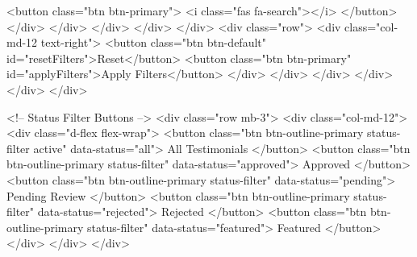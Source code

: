                                                                     <button class="btn btn-primary">
                                                                        <i class="fas fa-search"></i>
                                                                    </button>
                                                                </div>
                                                            </div>
                                                        </div>
                                                    </div>
                                                </div>
                                                <div class="row">
                                                    <div class="col-md-12 text-right">
                                                        <button class="btn btn-default" id="resetFilters">Reset</button>
                                                        <button class="btn btn-primary" id="applyFilters">Apply Filters</button>
                                                    </div>
                                                </div>
                                            </div>
                                        </div>
                                    </div>
                                </div>

                                <!-- Status Filter Buttons -->
                                <div class="row mb-3">
                                    <div class="col-md-12">
                                        <div class="d-flex flex-wrap">
                                            <button class="btn btn-outline-primary status-filter active" data-status="all">
                                                All Testimonials
                                            </button>
                                            <button class="btn btn-outline-primary status-filter" data-status="approved">
                                                Approved
                                            </button>
                                            <button class="btn btn-outline-primary status-filter" data-status="pending">
                                                Pending Review
                                            </button>
                                            <button class="btn btn-outline-primary status-filter" data-status="rejected">
                                                Rejected
                                            </button>
                                            <button class="btn btn-outline-primary status-filter" data-status="featured">
                                                Featured
                                            </button>
                                        </div>
                                    </div>
                                </div>

